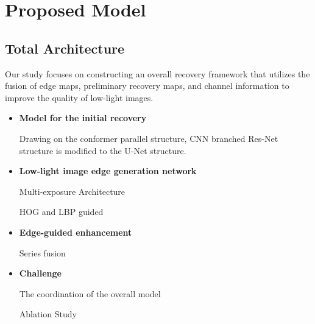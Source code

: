 \documentclass[CJK,aspectratio=169]{beamer}  %
\begin{document}
	\section{Proposed Model}
	
	\subsection{Total Architecture}
	
	\begin{frame}
		
		Our study focuses on constructing an overall recovery framework that utilizes the fusion of edge maps, preliminary recovery maps, and channel information to improve the quality of low-light images.
		
		
		\begin{itemize} 
			\item \textbf{Model for the initial recovery }
			
			\small Drawing on the conformer parallel structure, CNN branched Res-Net structure is modified to the U-Net structure.

			\item \textbf{Low-light image edge generation network}
			
			\small Multi-exposure Architecture
			
			\small HOG and LBP guided
			
			
			\item \textbf{Edge-guided enhancement}
			
			\small Series fusion
			
			\item \textbf{Challenge}
			
			\small The coordination of the overall model
			
			\small Ablation Study
			
			
		\end{itemize}
		
	\end{frame}
	
\end{document}
